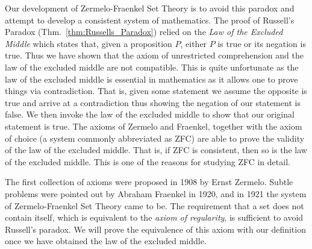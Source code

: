     Our development of Zermelo-Fraenkel Set Theory%
     is to avoid this paradox and attempt to
    develop a consistent system of mathematics. The proof of Russell's Paradox
    (Thm.~\ref{thm:Russells_Paradox}) relied on the
    \textit{Law of the Excluded Middle} which
    states that, given a proposition $P$, either $P$ is true or its negation is
    true. Thus we have shown that the axiom of unrestricted
    comprehension and the law of the
    excluded middle are not compatible. This is quite unfortunate as the law of
    the excluded middle is essential in mathematics as it allows one to prove
    things via contradiction. That is, given some
    statement we assume the opposite is true and arrive at a contradiction thus
    showing the negation of our statement is false. We then invoke the law of
    the excluded middle to show that our original statement is true. The axioms
    of Zermelo and Fraenkel, together with the axiom of choice (a system
    commonly abbreviated as \gls{ZFC}) are able to prove the validity of the law
    of the excluded middle. That is, if ZFC is consistent, then so is the law of
    the excluded middle. This is one of the reasons for studying ZFC in detail.
    \par\hfill\par
    The first collection of axioms were proposed in 1908 by
    Ernst Zermelo. Subtle problems were pointed out by
    Abraham Fraenkel in 1920, and in 1921 the system of
    Zermelo-Fraenkel Set Theory came to be.
    The requirement that a set does not contain itself, which is equivalent to
    the \textit{axiom of regularity}, is sufficient
    to avoid Russell's paradox. We will prove the equivalence of this axiom with
    our definition once we have obtained the law of the excluded middle.
